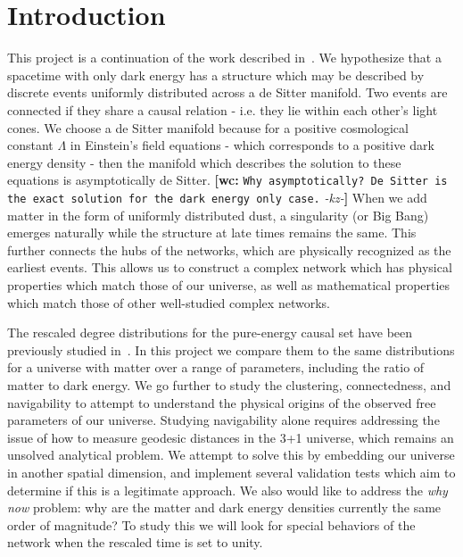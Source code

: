 \documentclass[preprint,notitlepage,amsmath,amssymb,floatfix]{revtex4-1}
\newcommand{\XXX}[3]{{\bf [#1: } {\tt #3} {\it -#2-}{\bf ]}}
\begin{document}
\section{Introduction}
This project is a continuation of the work described in~\cite{ref:nc2012}.  
We hypothesize that a spacetime with only dark energy has a structure which may be described by discrete events uniformly distributed across a de Sitter manifold.  
Two events are connected if they share a causal relation - i.e. they lie within each other's light cones.  
We choose a de Sitter manifold because for a positive cosmological constant $\Lambda$ in Einstein's field equations - which corresponds to a positive dark energy density - then the manifold which describes the solution to these equations is asymptotically de Sitter. \XXX{wc}{kz}{Why asymptotically? De Sitter is the exact solution for the dark energy only case.}
When we add matter in the form of uniformly distributed dust, a singularity (or Big Bang) emerges naturally while the structure at late times remains the same.  
This further connects the hubs of the networks, which are physically recognized as the earliest events.
This allows us to construct a complex network which has physical properties which match those of our universe, as well as mathematical properties which match those of other well-studied complex networks. \par
The rescaled degree distributions for the pure-energy causal set have been previously studied in~\cite{ref:nc2012}.
In this project we compare them to the same distributions for a universe with matter over a range of parameters, including the ratio of matter to dark energy.
We go further to study the clustering, connectedness, and navigability to attempt to understand the physical origins of the observed free parameters of our universe.
Studying navigability alone requires addressing the issue of how to measure geodesic distances in the 3+1 universe, which remains an unsolved analytical problem.
We attempt to solve this by embedding our universe in another spatial dimension, and implement several validation tests which aim to determine if this is a legitimate approach.
We also would like to address the \textit{why now} problem:  why are the matter and dark energy densities currently the same order of magnitude?
To study this we will look for special behaviors of the network when the rescaled time is set to unity.

\end{document}
